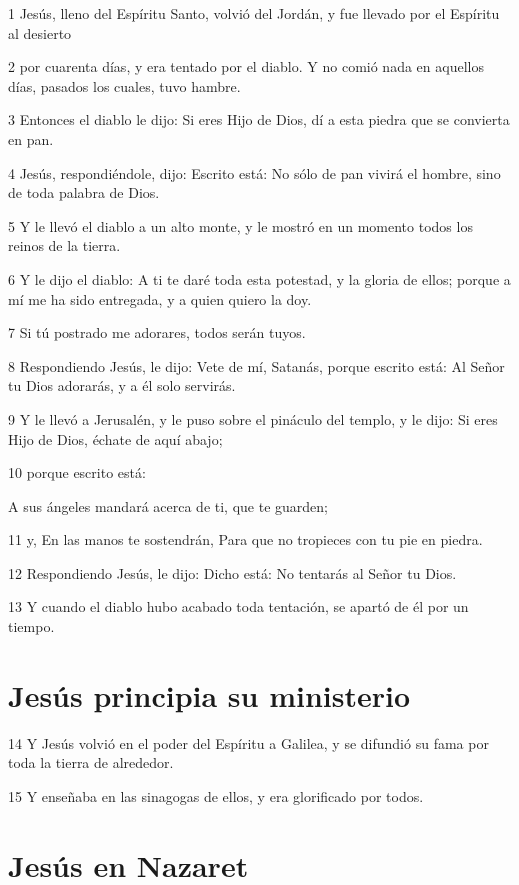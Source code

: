 \par 1 Jesús, lleno del Espíritu Santo, volvió del Jordán, y fue llevado por el Espíritu al desierto
\par 2 por cuarenta días, y era tentado por el diablo. Y no comió nada en aquellos días, pasados los cuales, tuvo hambre.
\par 3 Entonces el diablo le dijo: Si eres Hijo de Dios, dí a esta piedra que se convierta en pan.
\par 4 Jesús, respondiéndole, dijo: Escrito está: No sólo de pan vivirá el hombre, sino de toda palabra de Dios.
\par 5 Y le llevó el diablo a un alto monte, y le mostró en un momento todos los reinos de la tierra.
\par 6 Y le dijo el diablo: A ti te daré toda esta potestad, y la gloria de ellos; porque a mí me ha sido entregada, y a quien quiero la doy.
\par 7 Si tú postrado me adorares, todos serán tuyos.
\par 8 Respondiendo Jesús, le dijo: Vete de mí, Satanás, porque escrito está: Al Señor tu Dios adorarás, y a él solo servirás.
\par 9 Y le llevó a Jerusalén, y le puso sobre el pináculo del templo, y le dijo: Si eres Hijo de Dios, échate de aquí abajo;
\par 10 porque escrito está:
\par A sus ángeles mandará acerca de ti, que te guarden;
\par 11 y, En las manos te sostendrán, Para que no tropieces con tu pie en piedra.
\par 12 Respondiendo Jesús, le dijo: Dicho está: No tentarás al Señor tu Dios.
\par 13 Y cuando el diablo hubo acabado toda tentación, se apartó de él por un tiempo.

\section*{Jesús principia su ministerio}

\par 14 Y Jesús volvió en el poder del Espíritu a Galilea, y se difundió su fama por toda la tierra de alrededor.
\par 15 Y enseñaba en las sinagogas de ellos, y era glorificado por todos.

\section*{Jesús en Nazaret}

